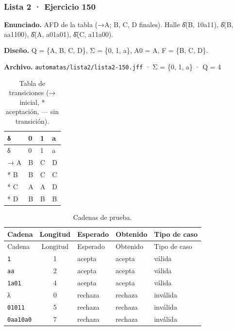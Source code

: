 
\hypertarget{lista-2-ejercicio-150}{%
\subsubsection{Lista 2 · Ejercicio 150}\label{lista-2-ejercicio-150}}

\textbf{Enunciado.} AFD de la tabla (→A; B, C, D finales). Halle δ̂(B, 10a11), δ̂(B, aa1100), δ̂(A, a01a01), δ̂(C, a11a00).

\textbf{Diseño.} Q = \{A, B, C, D\}, Σ = \{0, 1, a\}, A0 = A, F = \{B, C, D\}.

\textbf{Archivo.} \texttt{automatas/lista2/lista2-150.jff} · Σ = \{0, 1, a\} · \textbar Q\textbar{} = 4

\begin{longtable}[]{@{}llll@{}}
\caption{Tabla de transiciones (→ inicial, * aceptación, --- sin transición).}\tabularnewline
\toprule\noalign{}
δ & 0 & 1 & a \\
\midrule\noalign{}
\endfirsthead
\toprule\noalign{}
δ & 0 & 1 & a \\
\midrule\noalign{}
\endhead
\bottomrule\noalign{}
\endlastfoot
→ A & B & C & D \\
* B & B & C & C \\
* C & A & A & D \\
* D & B & B & B \\
\end{longtable}

\begin{longtable}[]{@{}lclll@{}}
\caption{Cadenas de prueba.}\tabularnewline
\toprule\noalign{}
Cadena & Longitud & Esperado & Obtenido & Tipo de caso \\
\midrule\noalign{}
\endfirsthead
\toprule\noalign{}
Cadena & Longitud & Esperado & Obtenido & Tipo de caso \\
\midrule\noalign{}
\endhead
\bottomrule\noalign{}
\endlastfoot
\texttt{1} & 1 & acepta & acepta & válida \\
\texttt{aa} & 2 & acepta & acepta & válida \\
\texttt{1a01} & 4 & acepta & acepta & válida \\
λ & 0 & rechaza & rechaza & inválida \\
\texttt{01011} & 5 & rechaza & rechaza & inválida \\
\texttt{0aa10a0} & 7 & rechaza & rechaza & inválida \\
\end{longtable}

